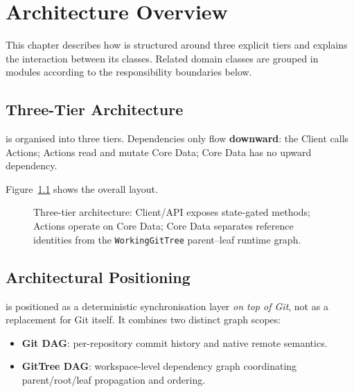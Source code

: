 
\chapter{Architecture Overview}
\label{chap:architecture}

This chapter describes how \cgspkg{} is structured around three explicit tiers
and explains the interaction between its classes. Related domain classes are
grouped in modules according to the responsibility boundaries below.

\section{Three-Tier Architecture}
\label{sec:three-tier}

\cgspkg{} is organised into three tiers.  Dependencies only flow
\textbf{downward}: the Client calls Actions; Actions read and mutate Core Data;
Core Data has no upward dependency.

Figure~\ref{fig:three-tier} shows the overall layout.

\begin{figure}[ht]
\centering
\caption{Three-tier architecture: Client/API exposes state-gated methods;
  Actions operate on Core Data; Core Data separates reference identities from
  the \texttt{WorkingGitTree} parent--leaf runtime graph.}
\label{fig:three-tier}

\end{figure}

\section{Architectural Positioning}
\label{sec:architectural-positioning}

\cgspkg{} is positioned as a deterministic synchronisation layer \emph{on top of
Git}, not as a replacement for Git itself. It combines two distinct graph
scopes:

\begin{itemize}
  \item \textbf{Git DAG}: per-repository commit history and native remote
    semantics.
  \item \textbf{GitTree DAG}: workspace-level dependency graph coordinating
    parent/root/leaf propagation and ordering.
\end{itemize}

